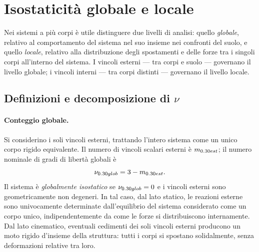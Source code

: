 \section{Isostaticità globale e locale}
\label{sec:globale_locale}

Nei sistemi a più corpi è utile distinguere due livelli di
analisi: quello \emph{globale}, relativo al comportamento del
sistema nel suo insieme nei confronti del suolo, e quello
\emph{locale}, relativo alla distribuzione degli spostamenti
e delle forze tra i singoli corpi all'interno del sistema.
I vincoli esterni --- tra corpi e suolo --- governano il
livello globale; i vincoli interni --- tra corpi distinti ---
governano il livello locale.

\subsection{Definizioni e decomposizione di \texorpdfstring{$\nu$}{ν}}
\label{sec:iso_globale_locale}

\paragraph{Conteggio globale.}
Si considerino i soli vincoli esterni, trattando l'intero
sistema come un unico corpo rigido equivalente. Il numero di
vincoli scalari esterni è $m_{\rm est}$; il numero nominale
di gradi di libertà globali è
\begin{equation}\label{eq:nu_glob}
	\nu_{\rm glob} = 3 - m_{\rm est}.
\end{equation}
Il sistema è \emph{globalmente isostatico} se $\nu_{\rm glob}
= 0$ e i vincoli esterni sono geometricamente non degeneri.
In tal caso, dal lato statico, le reazioni esterne sono
univocamente determinate dall'equilibrio del sistema
considerato come un corpo unico, indipendentemente da come
le forze si distribuiscono internamente. Dal lato cinematico,
eventuali cedimenti dei soli vincoli esterni producono un
moto rigido d'insieme della struttura: tutti i corpi si
spostano solidalmente, senza deformazioni relative tra loro.

